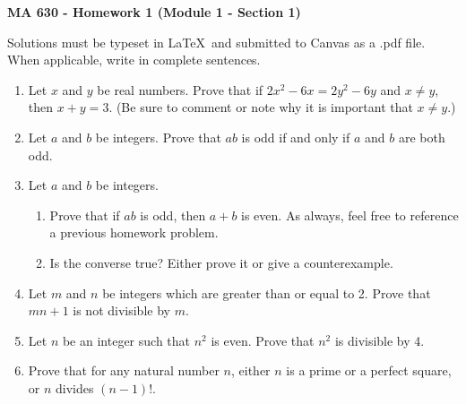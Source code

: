 \documentclass[12pt]{article}
\begin{document}
\pagestyle{empty}

 {\noindent \textbf{\large MA 630 - Homework 1 (Module 1 - Section 1)}}
\vspace{.25in}

\noindent Solutions must be typeset in \LaTeX \ and submitted to Canvas as a .pdf file. When applicable, write in complete sentences.
\vspace{.25in}


\begin{enumerate}
\item Let $x$ and $y$ be real numbers. Prove that if $2x^2 - 6x = 2y^2 - 6y$ and $x \neq y$, then $x + y = 3$.  (Be sure to comment or note why it is important that $x\not= y$.)

\item Let $a$ and $b$ be integers. Prove that $ab$ is odd if and only if $a$ and $b$ are both odd.

\item Let $a$ and $b$ be integers.
	\begin{enumerate}
	\item Prove that if $ab$ is odd, then $a + b$ is even. As always, feel free to reference a previous homework problem.
	\item Is the converse true? Either prove it or give a counterexample.
	\end{enumerate}

\item Let $m$ and $n$ be integers which are greater than or equal to 2. Prove that $mn + 1$ is not divisible by $m$.

\item Let $n$ be an integer such that $n^2$ is even.  Prove that $n^2$ is divisible by 4.

\item Prove that for any natural number $n$, either $n$ is a prime or a perfect square, or $n$ divides $(n-1)!$.
\end{enumerate}
\end{document}
